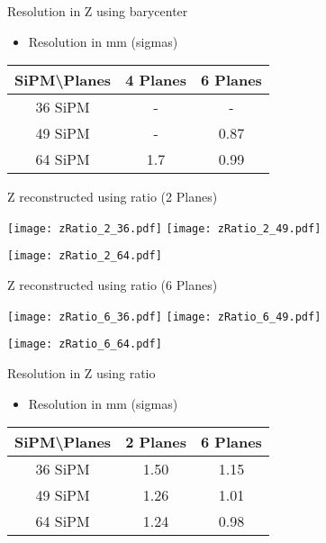 \documentclass{beamer}
\begin{document}
\begin{frame}{Resolution in Z using barycenter}
\begin{center}
\begin{itemize}
\item Resolution in mm (sigmas)
\vspace{0.5 cm}
\end{itemize}
 \begin{tabular}{c|cc|}
  \toprule
  SiPM\textbackslash Planes & \textbf{4 Planes} & \textbf{6 Planes} \\
   \hline
  36 SiPM & - & -  \\
  49 SiPM & - & 0.87 \\
  64 SiPM & 1.7 & 0.99 \\
    \toprule
 \end{tabular}
\end{center}
\end{frame}

\begin{frame}{Z reconstructed using ratio (2 Planes)}
\begin{adjustwidth}{-1.5em}{-1.5em}
	\texttt{[image: zRatio\_2\_36.pdf]}
	\texttt{[image: zRatio\_2\_49.pdf]} \\
	\begin{center} {\texttt{[image: zRatio\_2\_64.pdf]}} \end{center}
\end{adjustwidth}
\end{frame}


\begin{frame}{Z reconstructed using ratio (6 Planes)}
\begin{adjustwidth}{-1.5em}{-1.5em}
	\texttt{[image: zRatio\_6\_36.pdf]}
	\texttt{[image: zRatio\_6\_49.pdf]} \\
	\begin{center} {\texttt{[image: zRatio\_6\_64.pdf]}} \end{center}
\end{adjustwidth}
\end{frame}

\begin{frame}{Resolution in Z using ratio}
\begin{center}
\begin{itemize}
\item Resolution in mm (sigmas)
\vspace{0.5 cm}
\end{itemize}
 \begin{tabular}{c|cc|}
  \toprule
  SiPM\textbackslash Planes & \textbf{2 Planes} & \textbf{6 Planes} \\
   \hline
  36 SiPM & 1.50 & 1.15  \\
  49 SiPM & 1.26 & 1.01 \\
  64 SiPM & 1.24 & 0.98 \\
    \toprule
 \end{tabular}
\end{center}
\end{frame}
\end{document}
